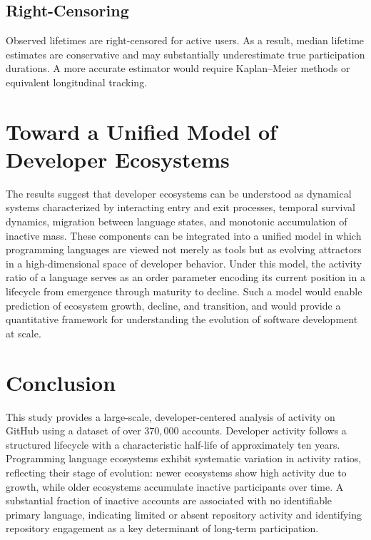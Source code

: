 \documentclass[12pt,a4paper]{article}
\begin{document}
\subsection{Right-Censoring}

Observed lifetimes are right-censored for active users. As a result, median lifetime estimates are conservative and may substantially underestimate true participation durations. A more accurate estimator would require Kaplan--Meier methods or equivalent longitudinal tracking.

\section{Toward a Unified Model of Developer Ecosystems}

The results suggest that developer ecosystems can be understood as dynamical systems characterized by interacting entry and exit processes, temporal survival dynamics, migration between language states, and monotonic accumulation of inactive mass. These components can be integrated into a unified model in which programming languages are viewed not merely as tools but as evolving attractors in a high-dimensional space of developer behavior. Under this model, the activity ratio of a language serves as an order parameter encoding its current position in a lifecycle from emergence through maturity to decline. Such a model would enable prediction of ecosystem growth, decline, and transition, and would provide a quantitative framework for understanding the evolution of software development at scale.

\section{Conclusion}

This study provides a large-scale, developer-centered analysis of activity on GitHub using a dataset of over $370{,}000$ accounts. Developer activity follows a structured lifecycle with a characteristic half-life of approximately ten years. Programming language ecosystems exhibit systematic variation in activity ratios, reflecting their stage of evolution: newer ecosystems show high activity due to growth, while older ecosystems accumulate inactive participants over time. A substantial fraction of inactive accounts are associated with no identifiable primary language, indicating limited or absent repository activity and identifying repository engagement as a key determinant of long-term participation.
\end{document}
